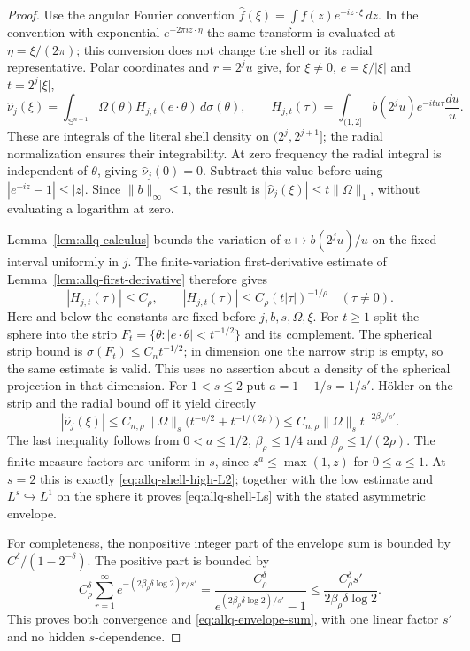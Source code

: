 \documentclass[11pt]{article}
\numberwithin{equation}{section}
\theoremstyle{remark}
\theoremstyle{definition}
\newcommand{\Sph}{\mathbb S}
\begin{document}
\begin{proof}
Use the angular Fourier convention $\widehat f(\xi)=\int
f(z)e^{-iz\cdot\xi}\,dz$.  In the convention with exponential
$e^{-2\pi iz\cdot\eta}$ the same transform is evaluated at
$\eta=\xi/(2\pi)$; this conversion does not change the shell or its
radial representative.  Polar coordinates and $r=2^ju$ give, for
$\xi\ne0$, $e=\xi/|\xi|$ and $t=2^j|\xi|$,
\[
 \widehat\nu_j(\xi)=\int_{\Sph^{n-1}}\Omega(\theta)
 H_{j,t}(e\cdot\theta)\,d\sigma(\theta),\qquad
 H_{j,t}(\tau)=\int_{(1,2]}b(2^ju)e^{-itu\tau}\frac{du}{u}.
\]
These are integrals of the literal shell density on
$(2^j,2^{j+1}]$; the radial normalization ensures their
integrability.  At zero frequency the radial integral is independent
of $\theta$, giving $\widehat\nu_j(0)=0$.  Subtract this value before
using $|e^{-iz}-1|\le|z|$.  Since $\|b\|_\infty\le1$, the result is
$|\widehat\nu_j(\xi)|\le t\|\Omega\|_1$, without evaluating a logarithm
at zero.

Lemma~\ref{lem:allq-calculus} bounds the variation of
$u\mapsto b(2^ju)/u$ on the fixed interval uniformly in $j$.
The finite-variation first-derivative estimate of
Lemma~\ref{lem:allq-first-derivative} therefore gives
\[
 |H_{j,t}(\tau)|\le C_\rho,
 \qquad |H_{j,t}(\tau)|\le C_\rho(t|\tau|)^{-1/\rho}
 \quad(\tau\ne0).
\]
Here and below the constants are fixed before $j,b,s,\Omega,\xi$.
For $t\ge1$ split the sphere into the strip
$F_t=\{\theta:|e\cdot\theta|<t^{-1/2}\}$ and its complement.
The spherical strip bound is
$\sigma(F_t)\le C_n t^{-1/2}$; in dimension one the narrow strip is
empty, so the same estimate is valid.  This uses no assertion about
a density of the spherical projection in that dimension.
For $1<s\le2$ put $a=1-1/s=1/s'$.  H\"older on the strip and the
radial bound off it yield directly
\[
 |\widehat\nu_j(\xi)|
 \le C_{n,\rho}\|\Omega\|_s
       \bigl(t^{-a/2}+t^{-1/(2\rho)}\bigr)
 \le C_{n,\rho}\|\Omega\|_s t^{-2\beta_\rho/s'}.
\]
The last inequality follows from $0<a\le1/2$,
$\beta_\rho\le1/4$ and $\beta_\rho\le1/(2\rho)$.
The finite-measure factors are uniform in $s$, since
$z^a\le\max(1,z)$ for $0\le a\le1$.  At $s=2$ this is exactly
\eqref{eq:allq-shell-high-L2}; together with the low estimate and
$L^s\hookrightarrow L^1$ on the sphere it proves
\eqref{eq:allq-shell-Ls} with the stated asymmetric envelope.

For completeness, the nonpositive integer part of the envelope sum is
bounded by $C^\delta/(1-2^{-\delta})$.  The positive part is bounded by
\[
 C_\rho^\delta\sum_{r=1}^{\infty}
 e^{-(2\beta_\rho\delta\log2)r/s'}
 =\frac{C_\rho^\delta}{e^{(2\beta_\rho\delta\log2)/s'}-1}
 \le\frac{C_\rho^\delta s'}{2\beta_\rho\delta\log2}.
\]
This proves both convergence and \eqref{eq:allq-envelope-sum}, with
one linear factor $s'$ and no hidden $s$-dependence.
\end{proof}
\end{document}
